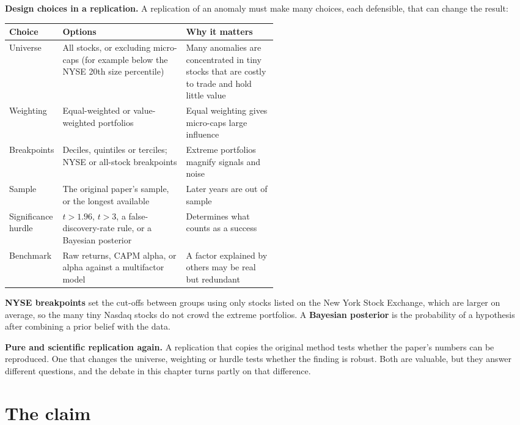 \textbf{Design choices in a replication.} A replication of an anomaly must make many choices, each defensible, that can change the result:

\begin{center}
\small
\begin{tabularx}{0.9\linewidth}{@{}>{\raggedright\arraybackslash}p{0.17\linewidth}>{\raggedright\arraybackslash}X>{\raggedright\arraybackslash}p{0.34\linewidth}@{}}
\toprule
Choice & Options & Why it matters \\
\midrule
Universe & All stocks, or excluding micro-caps (for example below the NYSE 20th size percentile) & Many anomalies are concentrated in tiny stocks that are costly to trade and hold little value \\
Weighting & Equal-weighted or value-weighted portfolios & Equal weighting gives micro-caps large influence \\
Breakpoints & Deciles, quintiles or terciles; NYSE or all-stock breakpoints & Extreme portfolios magnify signals and noise \\
Sample & The original paper's sample, or the longest available & Later years are out of sample \\
Significance hurdle & $t > 1.96$, $t > 3$, a false-discovery-rate rule, or a Bayesian posterior & Determines what counts as a success \\
Benchmark & Raw returns, CAPM alpha, or alpha against a multifactor model & A factor explained by others may be real but redundant \\
\bottomrule
\end{tabularx}
\end{center}

\textbf{NYSE breakpoints} set the cut-offs between groups using only stocks listed on the New York Stock Exchange, which are larger on average, so the many tiny Nasdaq stocks do not crowd the extreme portfolios. A \textbf{Bayesian posterior} is the probability of a hypothesis after combining a prior belief with the data.

\textbf{Pure and scientific replication again.} A replication that copies the original method tests whether the paper's numbers can be reproduced. One that changes the universe, weighting or hurdle tests whether the finding is robust. Both are valuable, but they answer different questions, and the debate in this chapter turns partly on that difference.

\section{The claim}
\label{sec:07-claim}

